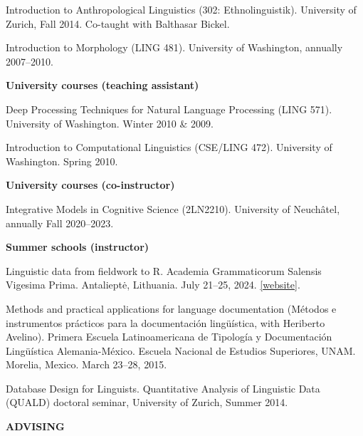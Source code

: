 \documentclass[11pt]{article}
\newcommand{\hangpara}{
 \setlength{\parindent}{0in} %
 \hangindent=0.42in %
}
\begin{document}
\vskip 6pt
\hangpara Introduction to Anthropological Linguistics (302: Ethnolinguistik). University of Zurich, Fall 2014. Co-taught with Balthasar Bickel.

\vskip 6pt
\hangpara Introduction to Morphology (LING 481). University of Washington, annually 2007--2010.

\begin{flushleft}
{\bf University courses (teaching assistant)}
\end{flushleft}
\hangpara Deep Processing Techniques for Natural Language Processing (LING 571). University of Washington. Winter 2010 \& 2009.

\vskip 6pt
\hangpara %
Introduction to Computational Linguistics (CSE/LING 472). University of Washington. Spring 2010.

\begin{flushleft}
{\bf University courses (co-instructor)}
\end{flushleft}
\hangpara Integrative Models in Cognitive Science (2LN2210). University of Neuchâtel, annually Fall 2020--2023.


\begin{flushleft}
{\bf Summer schools (instructor)}
\end{flushleft}


\hangpara Linguistic data from fieldwork to R. Academia Grammaticorum Salensis Vigesima Prima. Antalieptė, Lithuania. July 21--25, 2024. \href{https://www.academiasalensis.org/en/conference-and-summer-school/2024-summer-school/}{[website]}.

\vskip 6pt
\hangpara Methods and practical applications for language documentation (Métodos e instrumentos prácticos para la documentaci{\'o}n ling{\"u}{\'i}stica, with Heriberto Avelino). Primera Escuela Latinoamericana de Tipolog{\'i}a y Documentaci{\'o}n Ling{\"u}{\'i}stica Alemania-M{\'e}xico. Escuela Nacional de Estudios Superiores, UNAM. Morelia, Mexico. March 23--28, 2015.

\vskip 6pt
\hangpara Database Design for Linguists. Quantitative Analysis of Linguistic Data (QUALD) doctoral seminar, University of Zurich, Summer 2014.

\vskip 20pt
\begin{flushleft}
{\bf ADVISING}
\end{flushleft}
\end{document}
